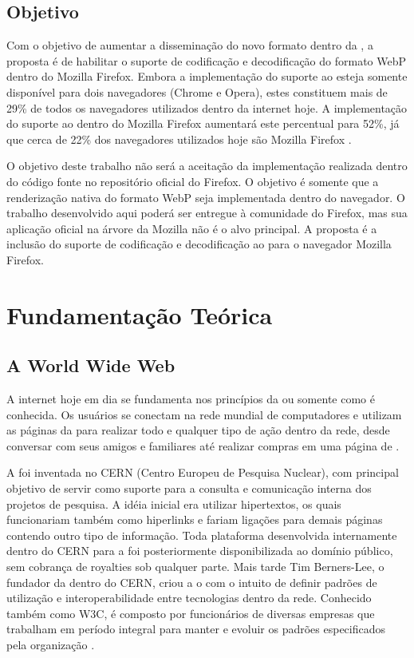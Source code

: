 \documentclass[espaco=simples,appendix=Name]{abnt}
\begin{document}
\section{Objetivo}

Com o objetivo de aumentar a disseminação do novo formato dentro da , a proposta é de habilitar o suporte de codificação e decodificação do formato WebP dentro do Mozilla Firefox. Embora a implementação do suporte ao  esteja somente disponível para dois navegadores (Chrome e Opera), estes constituem mais de 29\% de todos os navegadores utilizados dentro da internet hoje. A implementação do suporte ao  dentro do Mozilla Firefox aumentará este percentual para 52\%, já que cerca de 22\% dos navegadores utilizados hoje são Mozilla Firefox \cite{BrowserStats}.

O objetivo deste trabalho não será a aceitação da implementação realizada dentro do código fonte no repositório oficial do Firefox. O objetivo é somente que a renderização nativa do formato WebP seja implementada dentro do navegador. O trabalho desenvolvido aqui poderá ser entregue à comunidade do Firefox, mas sua aplicação oficial na árvore da Mozilla não é o alvo principal. A proposta é a inclusão do suporte de codificação e decodificação ao  para o navegador Mozilla Firefox.



\chapter{Fundamentação Teórica}

\section{A World Wide Web}

A internet hoje em dia se fundamenta nos princípios da  ou somente  como é conhecida. Os usuários se conectam na rede mundial de computadores e utilizam as páginas da  para realizar todo e qualquer tipo de ação dentro da rede, desde conversar com seus amigos e familiares até realizar compras em uma página de .

A  foi inventada no CERN (Centro Europeu de Pesquisa Nuclear), com principal objetivo de servir como suporte para a consulta e comunicação interna dos projetos de pesquisa\cite{WebStory}. A idéia inicial era utilizar hipertextos, os quais funcionariam também como hiperlinks e fariam ligações para demais páginas contendo outro tipo de informação. Toda plataforma desenvolvida internamente dentro do CERN para a  foi posteriormente disponibilizada ao domínio público, sem cobrança de royalties sob qualquer parte. Mais tarde Tim Berners-Lee, o fundador da  dentro do CERN, criou a o  com o intuito de definir padrões de utilização e interoperabilidade entre tecnologias dentro da rede. Conhecido também como W3C, é composto por funcionários de diversas empresas que trabalham em período integral para manter e evoluir os padrões especificados pela organização \cite{W3Cfacts}.
\end{document}
